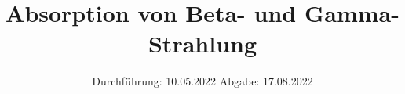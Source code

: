 

\subject{V704}
\title{Absorption von Beta- und Gamma-Strahlung}
\date{
  Durchführung: 10.05.2022
  \hspace{3em}
  Abgabe: 17.08.2022
}



\maketitle
\thispagestyle{empty}
\tableofcontents
\newpage








\newpage
\printbibliography{}
\nocite{matplotlib}
\nocite{numpy}
\nocite{scipy}
\nocite{uncertainties}
\nocite{reback2020pandas}

\newpage



